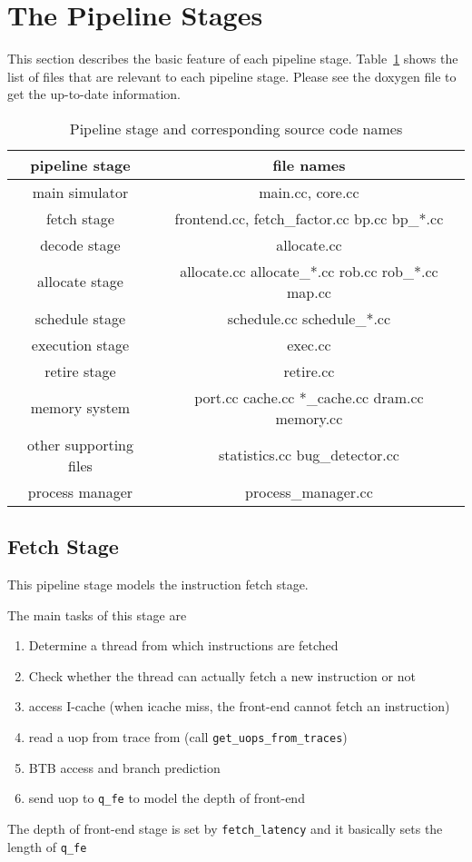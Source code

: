 
\clearpage
\section{The Pipeline Stages}

This section describes the basic feature of each pipeline stage. 
Table~\ref{table:pipeline} shows the list of files that are relevant to each pipeline stage. 
Please see the doxygen file to get the up-to-date information. 


\begin{table}[htb]
\begin{tabular}{|c||c|}
\hline 

pipeline stage & file names \\ \hline \hline 
main simulator & main.cc, core.cc  \\ \hline 

fetch stage & frontend.cc, fetch\_factor.cc bp.cc bp\_*.cc   \\ \hline 
decode stage &  allocate.cc \\ \hline 
allocate stage & allocate.cc allocate\_*.cc rob.cc rob\_*.cc map.cc  \\ \hline 
schedule stage & schedule.cc schedule\_*.cc  \\ \hline 
execution stage & exec.cc \\ \hline 
retire stage & retire.cc \\ \hline 
memory system &  port.cc cache.cc *\_cache.cc dram.cc memory.cc \\ 

other supporting files &  statistics.cc bug\_detector.cc   \\  \hline \hline 

process manager & process\_manager.cc \\ \hline 
\end{tabular}
\caption{Pipeline stage and corresponding source code names}
\label{table:pipeline}
\end{table}



\subsection{Fetch Stage}
This pipeline stage models the instruction fetch stage. 

The main tasks of this stage are 
\begin{enumerate}
\item Determine a thread from which instructions are fetched 
\item Check whether the thread can actually fetch a new instruction or not  
\item access I-cache  (when icache miss, the front-end cannot fetch an instruction) 
\item read a uop from trace from (call {\tt get\_uops\_from\_traces})
\item BTB access and branch prediction 
\item send uop to {\tt q\_fe} to model the depth of front-end 
\end{enumerate}
The depth of front-end stage is set by {\tt fetch\_latency} and it basically sets the length of 
{\tt q\_fe  }


